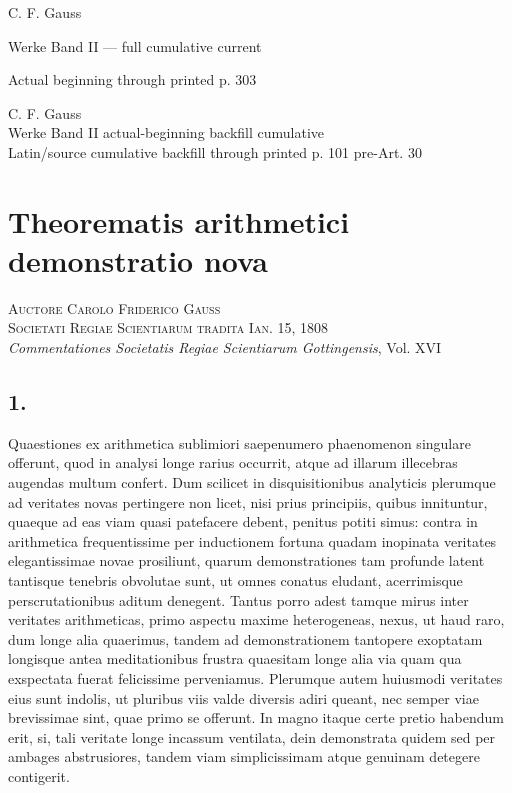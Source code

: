 \documentclass[12pt]{article}
\begin{document}
\begin{center}
{\Large C. F. Gauss}\par
{\large Werke Band II — full cumulative current}\par
{\large Actual beginning through printed p. 303}
\end{center}



\begin{center}
{\Large C. F. Gauss}\\[3pt]
{\large Werke Band II actual-beginning backfill cumulative}\\[3pt]
{\large Latin/source cumulative backfill through printed p. 101 pre-Art. 30}
\end{center}


\section*{Theorematis arithmetici demonstratio nova}

\begin{center}
\textsc{Auctore Carolo Friderico Gauss}\\
\textsc{Societati Regiae Scientiarum tradita Ian. 15, 1808}\\[3pt]
\emph{Commentationes Societatis Regiae Scientiarum Gottingensis}, Vol. XVI
\end{center}

\subsection*{1.}

Quaestiones ex arithmetica sublimiori saepenumero phaenomenon singulare offerunt, quod in analysi longe rarius occurrit, atque ad illarum illecebras augendas multum confert. Dum scilicet in disquisitionibus analyticis plerumque ad veritates novas pertingere non licet, nisi prius principiis, quibus innituntur, quaeque ad eas viam quasi patefacere debent, penitus potiti simus: contra in arithmetica frequentissime per inductionem fortuna quadam inopinata veritates elegantissimae novae prosiliunt, quarum demonstrationes tam profunde latent tantisque tenebris obvolutae sunt, ut omnes conatus eludant, acerrimisque perscrutationibus aditum denegent. Tantus porro adest tamque mirus inter veritates arithmeticas, primo aspectu maxime heterogeneas, nexus, ut haud raro, dum longe alia quaerimus, tandem ad demonstrationem tantopere exoptatam longisque antea meditationibus frustra quaesitam longe alia via quam qua exspectata fuerat felicissime perveniamus. Plerumque autem huiusmodi veritates eius sunt indolis, ut pluribus viis valde diversis adiri queant, nec semper viae brevissimae sint, quae primo se offerunt. In magno itaque certe pretio habendum erit, si, tali veritate longe incassum ventilata, dein demonstrata quidem sed per ambages abstrusiores, tandem viam simplicissimam atque genuinam detegere contigerit.
\end{document}
